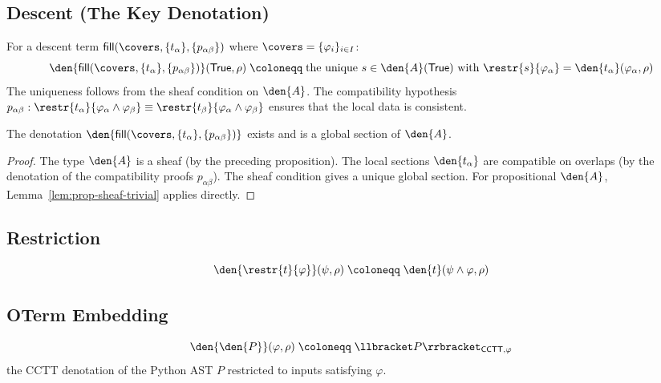 \subsection{Descent (The Key Denotation)}

\begin{definition}
\label{def:descent-denotation}
For a descent term
\(\mathsf{fill}(\covers, \{t_\alpha\}, \{p_{\alpha\beta}\})\)
where \(\covers = \{\varphi_i\}_{i \in I}\):
\[
  \den{\mathsf{fill}(\covers, \{t_\alpha\}, \{p_{\alpha\beta}\})}
  (\mathsf{True}, \rho)
  \;\coloneqq\;
  \text{the unique } s \in \den{A}(\mathsf{True})
  \text{ with }
  \restr{s}{\varphi_\alpha} = \den{t_\alpha}(\varphi_\alpha, \rho)
\]
The uniqueness follows from the sheaf condition on \(\den{A}\).
The compatibility hypothesis
\(p_{\alpha\beta} : \restr{t_\alpha}{\varphi_\alpha \wedge \varphi_\beta}
\equiv \restr{t_\beta}{\varphi_\alpha \wedge \varphi_\beta}\)
ensures that the local data is consistent.
\end{definition}

\begin{proposition}
The denotation \(\den{\mathsf{fill}(\covers, \{t_\alpha\}, \{p_{\alpha\beta}\})}\)
exists and is a global section of \(\den{A}\).
\end{proposition}

\begin{proof}
The type \(\den{A}\) is a sheaf (by the preceding proposition).
The local sections \(\den{t_\alpha}\) are compatible on overlaps
(by the denotation of the compatibility proofs \(p_{\alpha\beta}\)).
The sheaf condition gives a unique global section.
For propositional \(\den{A}\), Lemma~\ref{lem:prop-sheaf-trivial}
applies directly.
\end{proof}

\subsection{Restriction}

\[
  \den{\restr{t}{\varphi}}(\psi, \rho)
  \;\coloneqq\;
  \den{t}(\psi \wedge \varphi, \rho)
\]

\subsection{OTerm Embedding}

\[
  \den{\den{P}}(\varphi, \rho)
  \;\coloneqq\;
  \llbracket P \rrbracket_{\mathsf{CCTT}, \varphi}
\]
the CCTT denotation of the Python AST \(P\) restricted to inputs
satisfying \(\varphi\).


